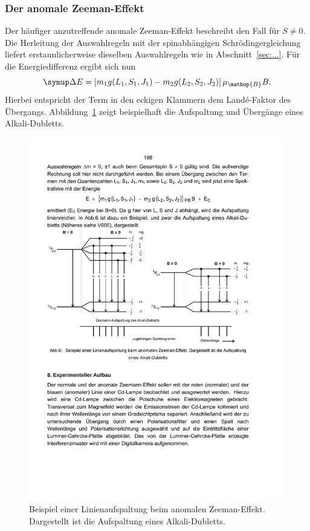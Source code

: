 \subsubsection{Der anomale Zeeman-Effekt}
%
Der häufiger anzutreffende anomale Zeeman-Effekt beschreibt den Fall für $S\neq0$.
Die Herleitung der Auswahlregeln mit der spinabhängigen Schrödingergleichung liefert erstaunlicherweise dieselben Auswahlregeln wie in Abschnitt~\ref{sec:...}.
Für die Energiedifferenz ergibt sich nun
%
\begin{equation}
    \upD E=\left[m_1g(L_1,S_1,J_1)-m_2g(L_2,S_2,J_2)\right]\mu_{\mathup{B}}B.
    \label{eq:dE_ano}
\end{equation}
%
Hierbei entspricht der Term in den eckigen Klammern dem Landé-Faktor des Übergangs.
Abbildung~\ref{fig:zeeman_anomal} zeigt beispielhaft die Aufspaltung und Übergänge eines Alkali-Dubletts.
%
\begin{figure}
    \centering
    \includegraphics[width=\textwidth]{figure/zeeman_anomal.pdf}
    \caption{Beispiel einer Linienaufspaltung beim anomalen Zeeman-Effekt. Dargestellt ist die Aufspaltung eines Alkali-Dubletts.\cite{V27}}
    \label{fig:zeeman_anomal}
\end{figure}
